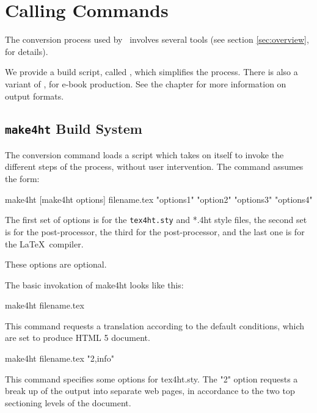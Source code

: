 \chapter{Calling Commands}
\label{sec:calling-commands}

The conversion process used by \texfourht\ involves several tools
(see section \ref{sec:overview},  for details). 


We provide a build script, called \makefourht, which simplifies the 
process. There is also a variant of \makefourht{},  
for e-book production. See the chapter 
for more information on output formats.


\section{\texttt{make4ht} Build System}
\label{sec:make4ht-intro}

The conversion command loads a script which takes on itself to invoke the
different steps of the process, without user intervention. The command assumes
the form:

\begin{shellcommand}
make4ht [make4ht options] filename.tex "options1" "option2" "options3" "options4"
\end{shellcommand}

The first set of options is for the \texttt{tex4ht.sty} and *.4ht style files, the
second set is for the  post-processor, the third for the 
post-processor, and the last one is for the \LaTeX\ compiler. 

These options are optional.

The basic invokation of make4ht looks like this:

\begin{shellcommand}
make4ht filename.tex
\end{shellcommand}

This command requests a translation according to the default conditions, which are set to produce HTML 5 document.

\begin{shellcommand}
make4ht filename.tex "2,info"
\end{shellcommand}

This command specifies some options for tex4ht.sty. The "2" option requests a
break up of the output into separate web pages, in accordance to the two top
sectioning levels of the document.

